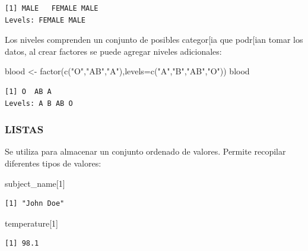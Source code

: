 \documentclass[
  letterpaper,
  DIV=11,
  numbers=noendperiod]{scrartcl}
\newenvironment{Shaded}{\begin{snugshade}}{\end{snugshade}}
\newcommand{\AttributeTok}[1]{\textcolor[rgb]{0.40,0.45,0.13}{#1}}
\newcommand{\DecValTok}[1]{\textcolor[rgb]{0.68,0.00,0.00}{#1}}
\newcommand{\FunctionTok}[1]{\textcolor[rgb]{0.28,0.35,0.67}{#1}}
\newcommand{\NormalTok}[1]{\textcolor[rgb]{0.00,0.23,0.31}{#1}}
\newcommand{\OtherTok}[1]{\textcolor[rgb]{0.00,0.23,0.31}{#1}}
\newcommand{\StringTok}[1]{\textcolor[rgb]{0.13,0.47,0.30}{#1}}
\begin{document}
\begin{verbatim}
[1] MALE   FEMALE MALE  
Levels: FEMALE MALE
\end{verbatim}

Los niveles comprenden un conjunto de posibles categor{[}ia que
podr{[}ian tomar los datos, al crear factores se puede agregar niveles
adicionales:

\begin{Shaded}
\begin{Highlighting}[]
\NormalTok{blood }\OtherTok{\textless{}{-}} \FunctionTok{factor}\NormalTok{(}\FunctionTok{c}\NormalTok{(}\StringTok{"O"}\NormalTok{,}\StringTok{"AB"}\NormalTok{,}\StringTok{"A"}\NormalTok{),}\AttributeTok{levels=}\FunctionTok{c}\NormalTok{(}\StringTok{"A"}\NormalTok{,}\StringTok{"B"}\NormalTok{,}\StringTok{"AB"}\NormalTok{,}\StringTok{"O"}\NormalTok{))}
\NormalTok{blood}
\end{Highlighting}
\end{Shaded}

\begin{verbatim}
[1] O  AB A 
Levels: A B AB O
\end{verbatim}

\hypertarget{listas}{%
\subsubsection{LISTAS}\label{listas}}

Se utiliza para almacenar un conjunto ordenado de valores. Permite
recopilar diferentes tipos de valores:

\begin{Shaded}
\begin{Highlighting}[]
\NormalTok{subject\_name[}\DecValTok{1}\NormalTok{]}
\end{Highlighting}
\end{Shaded}

\begin{verbatim}
[1] "John Doe"
\end{verbatim}

\begin{Shaded}
\begin{Highlighting}[]
\NormalTok{temperature[}\DecValTok{1}\NormalTok{]}
\end{Highlighting}
\end{Shaded}

\begin{verbatim}
[1] 98.1
\end{verbatim}
\end{document}
